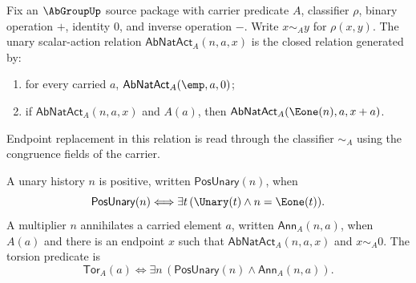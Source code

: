 \begin{definition}
\label{def:abgroup-unary-scalar-torsion}
Fix an $\AbGroupUp$ source package with carrier predicate $A$, classifier $\rho$, binary operation $+$, identity $0$, and inverse operation $-$. Write $x\sim_A y$ for $\rho(x,y)$. The unary scalar-action relation $\mathsf{AbNatAct}_A(n,a,x)$ is the closed relation generated by:
\begin{enumerate}
  \item for every carried $a$, $\mathsf{AbNatAct}_A(\emp,a,0)$;
  \item if $\mathsf{AbNatAct}_A(n,a,x)$ and $A(a)$, then $\mathsf{AbNatAct}_A(\Eone(n),a,x+a)$.
\end{enumerate}
Endpoint replacement in this relation is read through the classifier $\sim_A$ using the congruence fields of the carrier.

A unary history $n$ is positive, written $\mathsf{PosUnary}(n)$, when
$$
\mathsf{PosUnary}(n)\Longleftrightarrow \exists t\, (\Unary(t)\land n=\Eone(t)).
$$
A multiplier $n$ annihilates a carried element $a$, written $\mathsf{Ann}_A(n,a)$, when $A(a)$ and there is an endpoint $x$ such that $\mathsf{AbNatAct}_A(n,a,x)$ and $x\sim_A0$. The torsion predicate is
$$
\mathsf{Tor}_A(a)\Longleftrightarrow
\exists n\, (\mathsf{PosUnary}(n)\land \mathsf{Ann}_A(n,a)).
$$
\end{definition}

